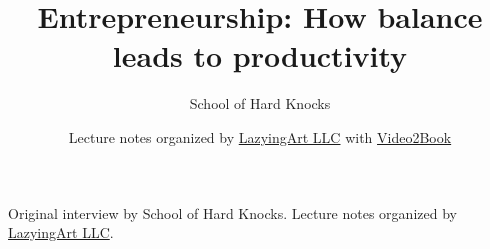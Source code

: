 \documentclass[11pt,oneside]{book}
\begin{document}
\frontmatter
\title{Entrepreneurship: How balance leads to productivity}
\author{School of Hard Knocks}
\date{Lecture notes organized by \href{https://lazying.art}{LazyingArt LLC} with \href{https://github.com/lachlanchen/Video2Book}{Video2Book}}
\maketitle
\begin{center}
\small Original interview by School of Hard Knocks. Lecture notes organized by \href{https://lazying.art}{LazyingArt LLC}.
\end{center}
\clearpage
\mainmatter

\end{document}
